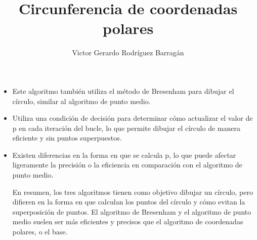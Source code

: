 \documentclass{article}
\title{Circunferencia de coordenadas polares}
\author{Victor Gerardo Rodríguez Barragán}
\date{}
\begin{document}
\maketitle
\justify

\begin{itemize}
\item
Este algoritmo también utiliza el método de Bresenham para dibujar el círculo, similar al algoritmo de punto medio.
\item
Utiliza una condición de decisión para determinar cómo actualizar el valor de p en cada iteración del bucle, lo que permite dibujar el círculo de manera eficiente y sin puntos superpuestos.
\item
Existen diferencias en la forma en que se calcula p, lo que puede afectar ligeramente la precisión o la eficiencia en comparación con el algoritmo de punto medio.

En resumen, los tres algoritmos tienen como objetivo dibujar un círculo, pero difieren en la forma en que calculan
los puntos del círculo y cómo evitan la superposición de puntos. El algoritmo de Bresenham y el algoritmo de punto medio
suelen ser más eficientes y precisos que el algoritmo de coordenadas polares, o el base.

\end{itemize}
\end{document}
